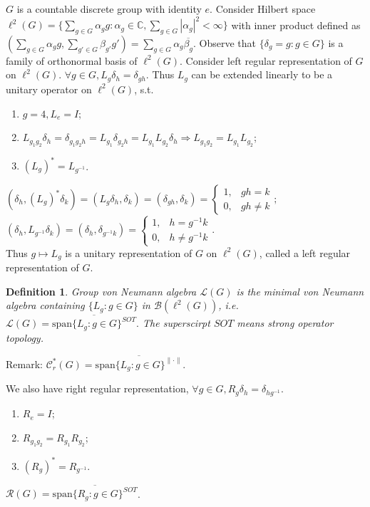 \documentclass[12pt]{article}
\newtheorem{definition}{Definition}
\begin{document}
$G$ is a countable discrete group with identity $e$. Consider Hilbert space $\ell^2(G)= \{\sum_{g\in G}\alpha_g g:\alpha_g\in\mathbb C,\sum_{g\in G}|\alpha_g|^2<\infty \}$ with inner product defined as $\left(\sum_{g\in G}\alpha_g g,\sum_{g'\in G}\beta_{g'}g' \right)=\sum_{g\in G}\alpha_g\overline{\beta_g} $. Observe that $\{\delta_g=g:g\in G \} $ is a family of orthonormal basis of $\ell^2(G)$. Consider left regular representation of $G$ on $\ell^2(G)$. $\forall g\in G,L_g\delta_h=\delta_{gh}. $ Thus $L_g$ can be extended linearly to be a unitary operator on $\ell^2(G)$, s.t.
\begin{enumerate}
	\item $g=4, L_e=I$;
	\item $L_{g_1g_2}\delta_h=\delta_{g_1g_2h}=L_{g_1}\delta_{g_2h}=L_{g_1}L_{g_2}\delta_h \Rightarrow L_{g_1g_2}=L_{g_1}L_{g_2}$;
	\item $(L_g)^*=L_{g^{-1}}$.
\end{enumerate}
$(\delta_h, (L_g)^*\delta_k)=(L_g\delta_h, \delta_k)=(\delta_{gh}, \delta_k)=\begin{cases} 1, & gh=k\\ 0, &gh\ne k \end{cases}; $\\
$(\delta_h, L_{g^{-1}}\delta_k)=(\delta_h, \delta_{g^{-1}k})=\begin{cases}1, &h=g^{-1}k \\ 0, &  h\ne g^{-1}k \end{cases} .$\\
Thus $g\mapsto L_g$ is a unitary representation of $G$ on $\ell^2(G)$, called a left regular representation of $G$.
\begin{definition}
Group von Neumann algebra $\mathcal L(G)$ is the minimal von Neumann algebra containing $\{L_g:g\in G \}$ in $\mathcal B(\ell^2(G))$, i.e. $\mathcal L(G)=\overline{\mathrm{span}\{L_g:g\in G \}^{SOT}} .$ The superscirpt $SOT$ means strong operator topology.
\end{definition}
Remark: $\mathcal C_r^*(G)=\overline{\mathrm{span}\{L_g:g\in G \}^{\|\cdot\|}}.$

We also have right regular representation, $\forall g\in G,R_g\delta_h=\delta_{hg^{-1}}. $
\begin{enumerate}
	\item $R_e=I$;
	\item $R_{g_1g_2}=R_{g_1}R_{g_2}$;
	\item $(R_g)^*=R_{g^{-1}}$.
\end{enumerate}
$\mathcal R(G)=\overline{\mathrm{span}\{R_g:g\in G \}^{SOT}}$.
\end{document}
